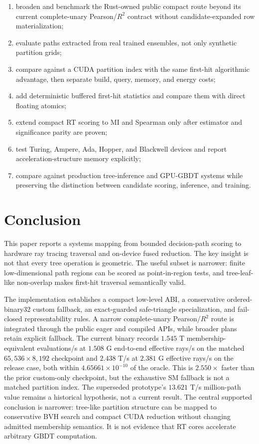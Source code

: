 \documentclass[11pt]{article}
\begin{document}
\begin{enumerate}
  \item broaden and benchmark the Rust-owned public compact route beyond its
  current complete-unary Pearson/$R^2$ contract without candidate-expanded row
  materialization;
  \item evaluate paths extracted from real trained ensembles, not only
  synthetic partition grids;
  \item compare against a CUDA partition index with the same first-hit
  algorithmic advantage, then separate build, query, memory, and energy costs;
  \item add deterministic buffered first-hit statistics and compare them with
  direct floating atomics;
  \item extend compact RT scoring to MI and Spearman only after estimator and
  significance parity are proven;
  \item test Turing, Ampere, Ada, Hopper, and Blackwell devices and report
  acceleration-structure memory explicitly;
  \item compare against production tree-inference and GPU-GBDT systems while
  preserving the distinction between candidate scoring, inference, and
  training.
\end{enumerate}

\section{Conclusion}

This paper reports a systems mapping from bounded decision-path scoring to
hardware ray tracing traversal and on-device fused reduction. The key insight
is not that every tree operation is geometric. The useful subset is narrower:
finite low-dimensional path regions can be scored as point-in-region tests, and
tree-leaf-like non-overlap makes first-hit traversal semantically valid.

The implementation establishes a compact low-level ABI, a conservative
ordered-binary32 custom fallback, an exact-guarded safe-triangle specialization,
and fail-closed representability rules. A narrow complete-unary Pearson/$R^2$ route is integrated
through the public eager and compiled APIs, while broader plans retain explicit
fallback. The current binary records $1.545$ T membership-equivalent
evaluations/s at $1.508$ G end-to-end effective rays/s on the matched
$65{,}536\times8{,}192$ checkpoint and $2.438$ T/s at $2.381$ G effective rays/s
on the release case, both within $4.65661\times10^{-10}$ of the oracle. This is
$2.550\times$ faster than the prior custom-only checkpoint, but the exhaustive
SM fallback is not a matched partition index. The superseded prototype's
$13.621$ T/s million-path value remains a historical hypothesis, not a current
result. The central supported conclusion is narrower: tree-like partition structure can be mapped to
conservative BVH search and compact CUDA reduction without changing admitted
membership semantics. It is not evidence that RT cores accelerate arbitrary
GBDT computation.
\end{document}

